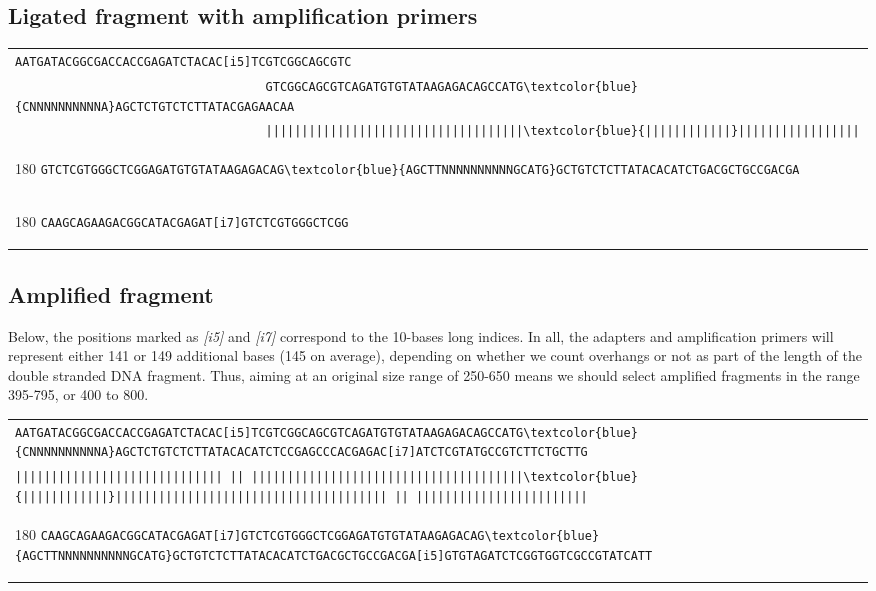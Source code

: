 \documentclass[a4paper,12pt]{article}
\begin{document}
\begin{flushleft}
\subsection*{Ligated fragment with amplification primers}
\begin{tabular}{l}
\Verb+AATGATACGGCGACCACCGAGATCTACAC[i5]TCGTCGGCAGCGTC+\\[-8pt]
\Verb+                                   GTCGGCAGCGTCAGATGTGTATAAGAGACAGCCATG\textcolor{blue}{CNNNNNNNNNNA}AGCTCTGTCTCTTATACGAGAACAA+\\[-6pt]
\Verb+                                   ||||||||||||||||||||||||||||||||||||\textcolor{blue}{||||||||||||}|||||||||||||||||+\\[-10pt]
   \begin{turn}{180}
   \Verb+GTCTCGTGGGCTCGGAGATGTGTATAAGAGACAG\textcolor{blue}{AGCTTNNNNNNNNNNGCATG}GCTGTCTCTTATACACATCTGACGCTGCCGACGA                                 +
   \end{turn}
\\[-8pt]
   \begin{turn}{180}
   \Verb+CAAGCAGAAGACGGCATACGAGAT[i7]GTCTCGTGGGCTCGG                                                                                                          +
   \end{turn}
\\
\end{tabular}
\vspace*{0.3cm}

\subsection*{Amplified fragment}
Below, the positions marked as \emph{[i5]} and \emph{[i7]} correspond to the 10-bases long indices. In all, the adapters and amplification primers will represent either 141 or 149 additional bases (145 on average), depending on whether we count overhangs or not as part of the length of the double stranded DNA fragment. Thus, aiming at an original size range of 250-650 means we should select amplified fragments in the range 395-795, or 400 to 800.
\begin{tabular}{l}
\Verb+AATGATACGGCGACCACCGAGATCTACAC[i5]TCGTCGGCAGCGTCAGATGTGTATAAGAGACAGCCATG\textcolor{blue}{CNNNNNNNNNNA}AGCTCTGTCTCTTATACACATCTCCGAGCCCACGAGAC[i7]ATCTCGTATGCCGTCTTCTGCTTG+\\[-8pt]
\Verb+||||||||||||||||||||||||||||| || ||||||||||||||||||||||||||||||||||||||\textcolor{blue}{||||||||||||}|||||||||||||||||||||||||||||||||||||| || ||||||||||||||||||||||||+\\[-10pt]
\begin{turn}{180}
\Verb+CAAGCAGAAGACGGCATACGAGAT[i7]GTCTCGTGGGCTCGGAGATGTGTATAAGAGACAG\textcolor{blue}{AGCTTNNNNNNNNNNGCATG}GCTGTCTCTTATACACATCTGACGCTGCCGACGA[i5]GTGTAGATCTCGGTGGTCGCCGTATCATT+
\end{turn}
\\
\end{tabular}

\end{flushleft}
 

\end{document}
